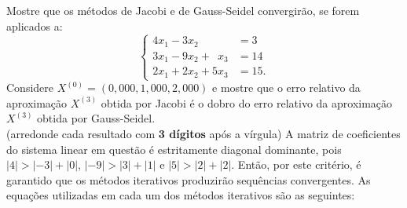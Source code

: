 \documentclass[12pt,a4paper]{article}
\begin{document}
\begin{ExerciseList}
\Exercise[title={4,0}]
Mostre que os métodos de Jacobi e de Gauss-Seidel convergirão, se forem aplicados a:
\[
\begin{cases}
4x_1-3x_2\phantom{+ 0 x_3 } &= 3\\
3x_1-9x_2+\phantom{1}x_3 &= 14\\
2x_1+2x_2+5x_3 &= 15.
\end{cases}
\]
Considere $X^{(0)} = (0,000, 1,000, 2,000)$ e mostre que o erro relativo da aproximação $X^{(3)}$ obtida por Jacobi é o dobro do erro relativo da aproximação $X^{(3)}$ obtida por Gauss-Seidel.
\\
(arredonde cada resultado com \textbf{3 dígitos} após a vírgula)
\Answer A matriz de coeficientes do sistema linear em questão é  estritamente diagonal dominante, pois $| 4| > |-3| + |0|$, $|-9| > | 3| + |1|$ e $| 5| > | 2| + |2|$. Então, por este critério, é garantido que os métodos iterativos produzirão sequências convergentes. As equações utilizadas em cada um dos métodos iterativos são as seguintes:


\end{ExerciseList}
\end{document}
